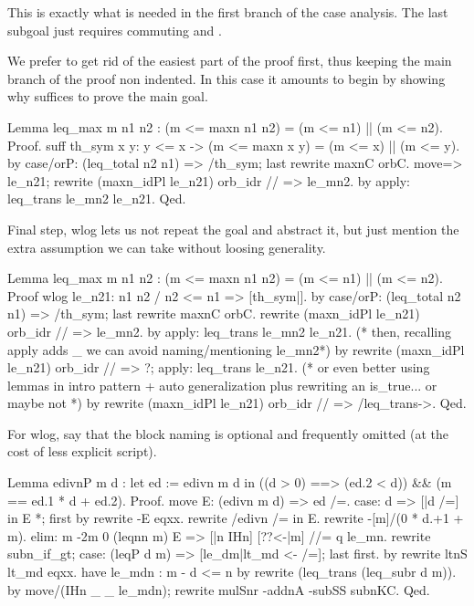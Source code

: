 This is exactly what is needed in the first branch of the case analysis.
The last subgoal just requires commuting  and \C{||}.

We prefer to get rid of the easiest part of the proof first, thus
keeping the main branch of the proof non indented. In this case
it amounts to begin by showing why  suffices to prove the main
goal.

\begin{coq}{}{}
Lemma leq_max m n1 n2 : (m <= maxn n1 n2) = (m <= n1) || (m <= n2).
Proof.
suff th_sym x y: y <= x -> (m <= maxn x y) = (m <= x) || (m <= y).
  by case/orP: (leq_total n2 n1) => /th_sym; last rewrite maxnC orbC.
move=> le_n21; rewrite (maxn_idPl le_n21) orb_idr // => le_mn2.
by apply: leq_trans le_mn2 le_n21.
Qed.
\end{coq}

Final step, wlog lets us not repeat the goal and abstract it, but
just mention the extra assumption we can take without loosing
generality.

\begin{coq}{}{}
Lemma leq_max m n1 n2 : (m <= maxn n1 n2) = (m <= n1) || (m <= n2).
Proof
wlog le_n21: n1 n2 / n2 <= n1 => [th_sym|].
  by case/orP: (leq_total n2 n1) => /th_sym; last rewrite maxnC orbC.
rewrite (maxn_idPl le_n21) orb_idr // => le_mn2.
by apply: leq_trans le_mn2 le_n21.
(* then, recalling apply adds _ we can avoid naming/mentioning le_mn2*)
by rewrite (maxn_idPl le_n21) orb_idr // => ?; apply: leq_trans le_n21.
(* or even better using lemmas in intro pattern + auto generalization
   plus rewriting an is_true... or maybe not *)
by rewrite (maxn_idPl le_n21) orb_idr // => /leq_trans->.
Qed.
\end{coq}

For wlog, say that the block naming  is optional and frequently
omitted (at the cost of less explicit script). 

\begin{coq}{}{}
Lemma edivnP m d :
 let ed := edivn m d in
   ((d > 0) ==> (ed.2 < d)) && (m == ed.1 * d + ed.2).
Proof.
move E: (edivn m d) => ed /=.
case: d => [|d /=] in E *; first by rewrite -E eqxx.
rewrite /edivn /= in E.
rewrite -[m]/(0 * d.+1 + m).
elim: m {-2}m 0 (leqnn m) E => [|n IHn] [??<-|m] //= q le_mn.
rewrite subn_if_gt; case: (leqP d m) => [le_dm|lt_md <- /=]; last first.
  by rewrite ltnS lt_md eqxx.
have le_mdn : m - d <= n by rewrite (leq_trans (leq_subr d m)).
by move/(IHn _ _ le_mdn); rewrite mulSnr -addnA -subSS subnKC.
Qed.
\end{coq}

